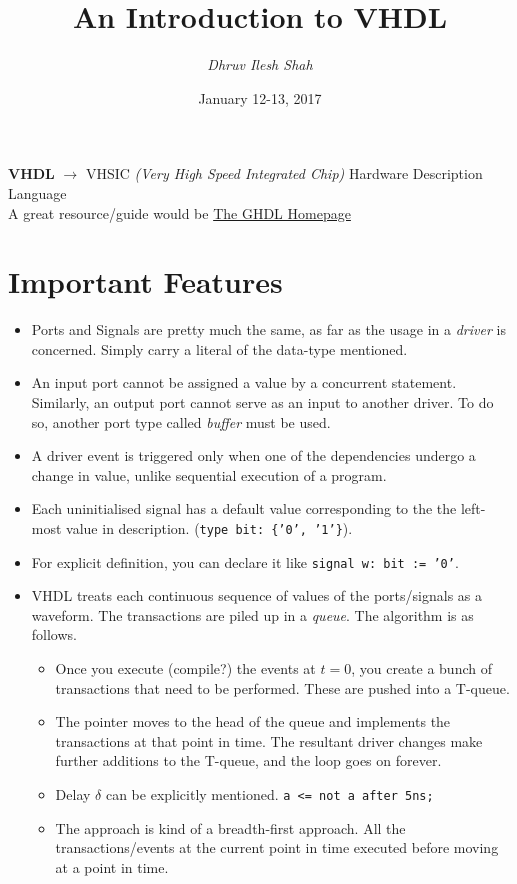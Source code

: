 \documentclass[a4paper]{article}
\title{An Introduction to VHDL}
\author{\it Dhruv Ilesh Shah}
\date{January 12-13, 2017}
\begin{document}
\maketitle

\begin{center}
{\bf VHDL} $\rightarrow$ VHSIC {\em(Very High Speed Integrated Chip)} Hardware Description Language \\
A great resource/guide would be \href{http://home.gna.org/ghdl/ghdl/index.html}{The GHDL Homepage}
\end{center}
\section*{Important Features}
\begin{itemize}
	\item Ports and Signals are pretty much the same, as far as the usage in a {\em driver} is concerned. Simply carry a literal of the data-type mentioned.
	\item An input port cannot be assigned a value by a concurrent statement. Similarly, an output port cannot serve as an input to another driver. To do so, another port type called {\em buffer} must be used.
	\item A driver event is triggered only when one of the dependencies undergo a change in value, unlike sequential execution of a program.
	\item Each uninitialised signal has a default value corresponding to the the left-most value in description. (\texttt{type bit: \{'0', '1'\}}).
	\item For explicit definition, you can declare it like  \texttt{signal w: bit := '0'}.
	\item VHDL treats each continuous sequence of values of the ports/signals as a waveform. The transactions are piled up in a {\em queue}. The algorithm is as follows.
	\begin{itemize}
		\item 	Once you execute (compile?) the events at $t=0$, you create a bunch of transactions that need to be performed. These are pushed into a T-queue.
		\item The pointer moves to the head of the queue and implements the transactions at that point in time. The resultant driver changes make further additions to the T-queue, and the loop goes on forever.
		\item Delay $\delta$ can be explicitly mentioned. \texttt{a <= not a after 5ns;}
		\item The approach is kind of a breadth-first approach. All the transactions/events at the current point in time executed before moving at a point in time.

\end{itemize}
\end{itemize}
\end{document}
